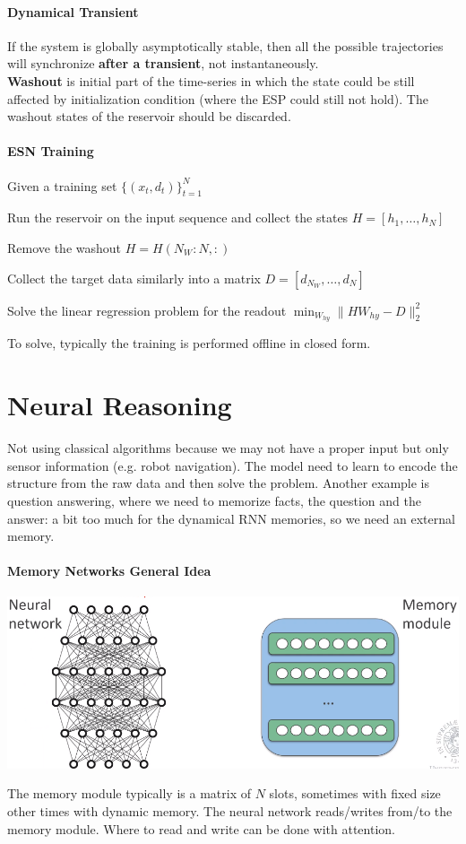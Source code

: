 \documentclass[10pt]{report}
\begin{document}
\paragraph{Dynamical Transient} If the system is globally asymptotically stable, then all the possible trajectories will synchronize \textbf{after a transient}, not instantaneously.\\
\textbf{Washout} is initial part of the time-series in which the state could be still affected by initialization condition (where the ESP could still not hold). The washout states of the reservoir should be discarded.
\paragraph{ESN Training}
\begin{list}{}{}
	\item Given a training set $\{(x_t,d_t)\}_{t=1}^N$
	\item Run the reservoir on the input sequence and collect the states $H=[h_1,\ldots,h_N]$
	\item Remove the washout $H = H(N_W:N,:)$
	\item Collect the target data similarly into a matrix $D = [d_{N_W},\ldots,d_N]$
	\item Solve the linear regression problem for the readout $\min_{W_{hy}}\|HW_{hy}-D \|^2_2$
\end{list}
To solve, typically the training is performed offline in closed form.
\section{Neural Reasoning}
Not using classical algorithms because we may not have a proper input but only sensor information (e.g. robot navigation). The model need to learn to encode the structure from the raw data and then solve the problem. Another example is question answering, where we need to memorize facts, the question and the answer: a bit too much for the dynamical RNN memories, so we need an external memory.
\paragraph{Memory Networks General Idea} \begin{center}
	\includegraphics[scale=0.5]{127.png}
\end{center}
The memory module typically is a matrix of $N$ slots, sometimes with fixed size other times with dynamic memory. The neural network reads/writes from/to the memory module. Where to read and write can be done with attention.
\end{document}
